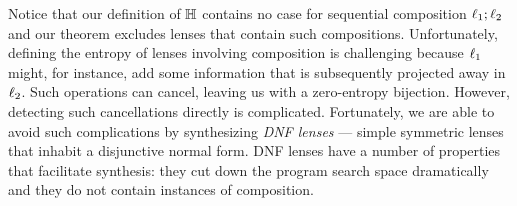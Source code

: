 \documentclass[acmsmall,screen,anonymous]{acmart}
\begin{document}
Notice that our definition of $\mathbb{H}$ contains no case for sequential
composition $\mathit{\ell}_1 ; \mathit{\ell}_2$ and our theorem excludes lenses that contain
such compositions. Unfortunately, defining the entropy of lenses involving
composition is challenging because $\mathit{\ell}_1$ might, for instance, add some
information that is subsequently projected away in $\mathit{\ell}_2$. Such operations
can cancel, leaving us with a zero-entropy bijection. However, detecting such
cancellations directly is complicated. Fortunately, we are able to avoid such
complications by synthesizing \emph{DNF lenses} — simple symmetric lenses that
inhabit a disjunctive normal form. DNF lenses have a number of properties that
facilitate synthesis: they cut down the program search space dramatically and
they do not contain instances of composition.


\end{document}
